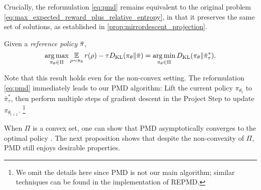 Crucially, the reformulation \cref{eq:pmd} remains equivalent to the
original problem \cref{eq:max_expected_reward_plus_relative_entropy},
in that it preserves the same set of solutions,
as established in \cref{prop:mirrordescent_projection}.

\begin{prop}
\label{prop:mirrordescent_projection}
Given a \emph{reference policy} $\bar{\pi}$,
{\small
\begin{equation*}
	\operatorname*{arg\,max}\limits_{\pi_\theta \in \Pi} { \operatorname*{\mathbb{E}}\limits_{\rho \sim \pi_\theta}{  r(\rho)  - \tau D_{\mathrm{KL}}(\pi_\theta \| \bar{\pi}) } } 
 = \operatorname*{arg\,min}\limits_{\pi_\theta \in \Pi}{ D_{\mathrm{KL}}(\pi_\theta \| \bar{\pi}_\tau^*) }.
\end{equation*}
}
\end{prop}
Note that this result holds even for the non-convex setting.
%
The reformulation \cref{eq:pmd} immediately leads to our PMD algorithm:
Lift the current policy $\pi_{\theta_t}$ to $\bar{\pi}_\tau^*$,
then perform multiple steps of gradient descent in the Project Step
to update $\pi_{\theta_{t+1}}$.%
%
\footnote{
We omit the details here since PMD is not our main algorithm;
similar techniques can be found in the implementation of REPMD. 
}

When $\Pi$ is a convex set, one can show that PMD asymptotically converges to the optimal policy \citep{nemirovskii1983problem,beck2003mirror}. 
The next proposition shows that despite the non-convexity of $\Pi$,
PMD still enjoys desirable properties.

